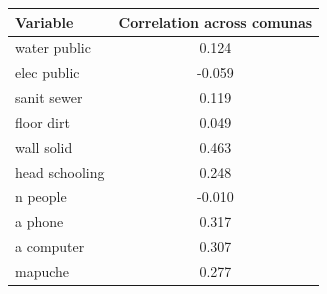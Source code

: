 \begin{tabular}{lc}
\toprule
Variable & Correlation across comunas \\
\midrule
water public & 0.124 \\
elec public & -0.059 \\
sanit sewer & 0.119 \\
floor dirt & 0.049 \\
wall solid & 0.463 \\
head schooling & 0.248 \\
n people & -0.010 \\
a phone & 0.317 \\
a computer & 0.307 \\
mapuche & 0.277 \\
\bottomrule
\end{tabular}

